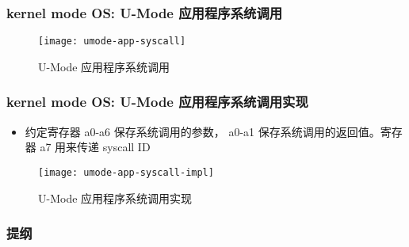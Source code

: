 \begin{frame}
    \frametitle{kernel mode OS: U-Mode 应用程序系统调用}
%        
%        
%        
    \begin{figure}
        \centering
        \texttt{[image: umode-app-syscall]}
        \caption{U-Mode 应用程序系统调用}
    \end{figure}
\end{frame}
\begin{frame}
    \frametitle{kernel mode OS: U-Mode 应用程序系统调用实现}
        \begin{itemize}
            
            \item 约定寄存器 a0-a6 保存系统调用的参数， a0-a1 保存系统调用的返回值。寄存器 a7 用来传递 syscall ID
            
        \end{itemize}	
    \begin{figure}
        \centering
        \texttt{[image: umode-app-syscall-impl]}
        \caption{U-Mode 应用程序系统调用实现}
    \end{figure}
\end{frame}

\begin{frame}
    \frametitle{提纲} 
    \tableofcontents 
\end{frame}


